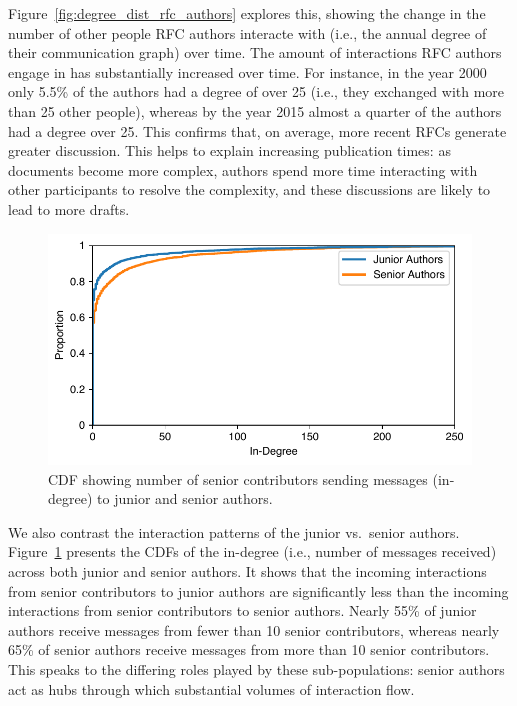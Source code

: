 \documentclass[twocolumn,10pt]{article}
\newlength{\figureWidthOneColumn}
\begin{document}
Figure~\ref{fig:degree_dist_rfc_authors} explores this, showing the change
in the number of other people RFC authors interacte with (i.e., the annual
degree of their communication graph) over time. The amount of interactions
RFC authors engage in has substantially increased over time. For instance,
in the year 2000 only 5.5\% of the authors had a degree of over 25 (i.e.,
they exchanged with more than 25 other people), whereas by the year 2015
almost a quarter of the authors had a degree over 25. This confirms that,
on average, more recent RFCs generate greater discussion. This helps to
explain increasing publication times: as documents become more complex,
authors spend more time interacting with other participants to resolve
the complexity, and these discussions are likely to lead to more drafts.

\begin{figure}
  \centering
  \includegraphics[width=\figureWidthOneColumn]{figures-prev/imc-2021/emails/junior_senior_authors_seniormem_indegree.pdf}
  \caption{
    CDF showing number of senior contributors sending messages (in-degree)
    to junior and senior authors.
  }
  \label{fig:junior_senior_indegree_seniormem}
\end{figure}

We also contrast the interaction patterns of the junior vs.\ senior
authors. Figure~\ref{fig:junior_senior_indegree_seniormem} presents the
CDFs of the in-degree (i.e., number of messages received) across both
junior and senior authors. It shows that the incoming interactions from
senior contributors to junior authors are significantly less than the
incoming interactions from senior contributors to senior authors. Nearly
55\% of junior authors receive messages from fewer than 10 senior
contributors, whereas nearly 65\% of senior authors receive messages from
more than 10 senior contributors.  This speaks to the differing roles
played by these sub-populations: senior authors act as hubs through which
substantial volumes of interaction flow.
\end{document}
